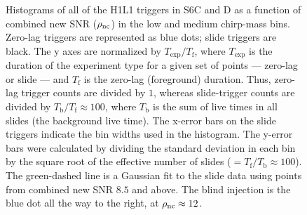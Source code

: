 \begin{figure}[p]
\center
{}
\label{fig:big_dog-non_cum_hist-extrap}
\caption{Histograms of all of the H1L1 triggers in S6C and D as a function of combined new \ac{SNR} ($\rho_{\mathrm{nc}}$) in the low and medium chirp-mass bins. Zero-lag triggers are represented as blue dots; slide triggers are black. The y axes are normalized by $T_{\mathrm{exp}}/T_{\mathrm{f}}$, where $T_{\mathrm{exp}}$ is the duration of the experiment type for a given set of points --- zero-lag or slide --- and $T_{\mathrm{f}}$ is the zero-lag (foreground) duration. Thus, zero-lag trigger counts are divided by $1$, whereas slide-trigger counts are divided by $T_{\mathrm{b}}/T_{\mathrm{f}} \approx 100$, where $T_{\mathrm{b}}$ is the sum of live times in all slides (the background live time). The x-error bars on the slide triggers indicate the bin widths used in the histogram. The y-error bars were calculated by dividing the standard deviation in each bin by the square root of the effective number of slides ($= T_{\mathrm{f}}/T_{\mathrm{b}} \approx 100$). The green-dashed line is a Gaussian fit to the slide data using points from combined new \ac{SNR} $8.5$ and above. The blind injection is the blue dot all the way to the right, at $\rho_{\mathrm{nc}} \approx 12$.}
\end{figure}

